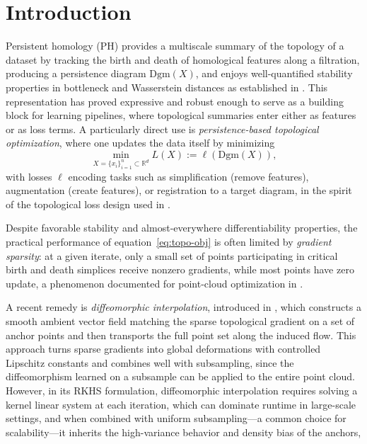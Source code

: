 \documentclass{article} %
\def\eqref#1{equation~\ref{#1}}
\newcommand{\R}{\mathbb{R}}
\newcommand{\Dgm}{\mathrm{Dgm}}
\theoremstyle{plain}
\theoremstyle{definition}
\theoremstyle{remark}
\begin{document}
\section{Introduction}
Persistent homology (PH) provides a multiscale summary of the topology of a dataset by tracking the birth and death of homological features along a filtration, producing a persistence diagram $\Dgm(X)$, and enjoys well-quantified stability properties in bottleneck and Wasserstein distances as established in \citet{convergence-rates, Skraba2020WassersteinSF}. This representation has proved expressive and robust enough to serve as a building block for learning pipelines, where topological summaries enter either as features or as loss terms. A particularly direct use is \emph{persistence-based topological optimization}, where one updates the data itself by minimizing
\begin{equation}
    \label{eq:topo-obj}
    \min_{X = \{ x_i\}_{i=1}^n \subset \R^d}  L(X) := \ell(\Dgm(X)),
\end{equation}
with losses $\ell$ encoding tasks such as simplification (remove features), augmentation (create features), or registration to a target diagram, in the spirit of the topological loss design used in \citet{toposeg}.

Despite favorable stability and almost-everywhere differentiability properties, the practical performance of \eqref{eq:topo-obj} is often limited by \emph{gradient sparsity}: at a given iterate, only a small set of points participating in critical birth and death simplices receive nonzero gradients, while most points have zero update, a phenomenon documented for point-cloud optimization in \cite{diffeomorphic}.

A recent remedy is \emph{diffeomorphic interpolation}, introduced in \cite{diffeomorphic}, which constructs a smooth ambient vector field matching the sparse topological gradient on a set of anchor points and then transports the full point set along the induced flow. This approach turns sparse gradients into global deformations with controlled Lipschitz constants and combines well with subsampling, since the diffeomorphism learned on a subsample can be applied to the entire point cloud. However, in its RKHS formulation, diffeomorphic interpolation requires solving a kernel linear system at each iteration, which can dominate runtime in large-scale settings, and when combined with uniform subsampling---a common choice for scalability---it inherits the high-variance behavior and density bias of the anchors,
\end{document}
